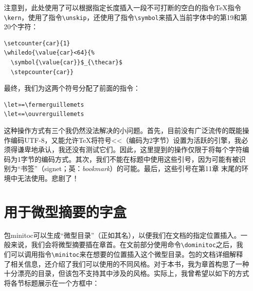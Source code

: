 注意到，此处使用了可以根据指定长度插入一段不可打断的空白的指令\TeX 指令\verb|\kern|，使用了指令\verb|\unskip|，还使用了指令\verb|\symbol|来插入当前字体中的第19和第20个字符：

\begin{codelist}[10.10]{
\setcounter{car}{1}
 \selectfont
{}
}
\begin{verbatim}
\setcounter{car}{1}
\whiledo{\value{car}<64}{%
  \symbol{\value{car}}$_{\thecar}$
  \stepcounter{car}}\end{verbatim}
\end{codelist}

最终，我们为这两个符号分配了前面的指令：

\begin{dmd}
\begin{verbatim}
\let»=\fermerguillemets
\let«=\ouvrerguillemets\end{verbatim}
\end{dmd}

\begin{qquestion}
这种操作方式有三个我仍然没法解决的小问题。首先，目前没有广泛流传的既能操作编码UTF-8，又能允许\TeX 将符号<<（编码为2字节）设置为活跃的引擎，我必须得谦卑地承认，我还没有测试它们。因此，这里提到的操作仅限于将每个字符编码为1字节的编码方式。其次，我们不能在标题中使用这些引号，因为可能有被识别为``书签''（signet；英：\emph{bookmark}）的可能。最后，这些引号在第11章%
末尾的环境中无法使用。悲剧了！
\end{qquestion}

\section{用于微型摘要的字盒}

包\textsf{minitoc}可以生成``微型目录''（正如其名），以便我们在文档的指定位置插入。一般来说，我们会将微型摘要插在章首。在文前部分使用命令\verb|\dominitoc|之后，我们可以调用指令\verb|\minitoc|来在想要的位置插入这个微型目录。包的文档详细解释了相关信息，还介绍了我们可以使用的不同风格。对于本书，我为章首构思了一种十分漂亮的目录，但该包不支持其中涉及的风格。实际上，我曾希望以如下的方式将各节标题展示在一个方框中：

\begin{center}
\end{center}

